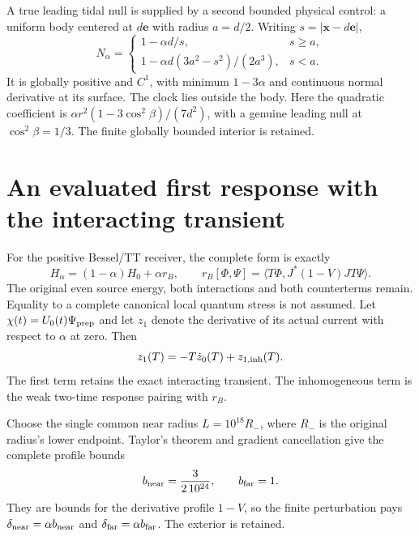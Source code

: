 A true leading tidal null is supplied by a second bounded physical
control: a uniform body centered at $d\mathbf e$ with radius $a=d/2$.
Writing $s=|\mathbf x-d\mathbf e|$,
\[
 N_\alpha=\begin{cases}
 1-\alpha d/s,&s\ge a,\\
 1-\alpha d(3a^2-s^2)/(2a^3),&s<a.
 \end{cases}
\]
It is globally positive and $C^1$, with minimum $1-3\alpha$ and continuous
normal derivative at its surface. The clock lies outside the body. Here
the quadratic coefficient is
$\alpha r^2(1-3\cos^2\beta)/(7d^2)$, with a genuine leading null at
$\cos^2\beta=1/3$. The finite globally bounded interior is retained.

\section{An evaluated first response with the interacting transient}
For the positive Bessel/TT receiver, the complete form is exactly
\[
 H_\alpha=(1-\alpha)H_0+\alpha r_B,\qquad
 r_B[\Phi,\Psi]=\langle T\Phi,J^*(1-V)JT\Psi\rangle.
\]
The original even source energy, both interactions and both counterterms
remain. Equality to a complete canonical local quantum stress is not assumed.
Let $\chi(t)=U_0(t)\Psi_{\rm prep}$ and let $z_1$ denote the derivative
of its actual current with respect to $\alpha$ at zero. Then
\[
 z_1(T)=-T\dot z_0(T)+z_{1,\rm inh}(T).
\]
The first term retains the exact interacting transient. The inhomogeneous
term is the weak two-time response pairing with $r_B$.

Choose the single common near radius $L=10^{18}R_-$, where $R_-$ is the
original radius's lower endpoint. Taylor's theorem and gradient cancellation
give the complete profile bounds
\[
 b_{\rm near}=\frac{3}{2\,10^{24}},\qquad b_{\rm far}=1.
\]
They are bounds for the derivative profile $1-V$, so the finite perturbation
pays $\delta_{\rm near}=\alpha b_{\rm near}$ and
$\delta_{\rm far}=\alpha b_{\rm far}$. The exterior is retained.


